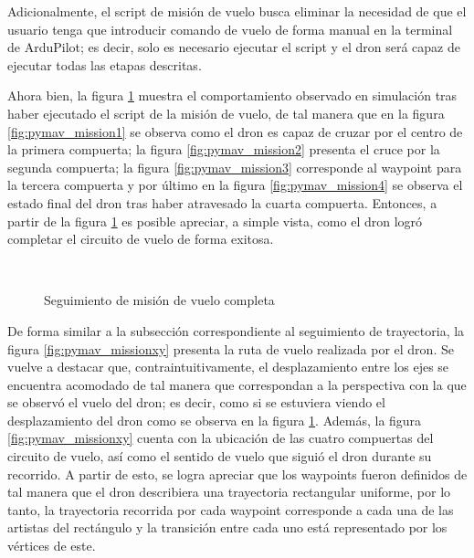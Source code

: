 Adicionalmente, el script de misión de vuelo busca eliminar la necesidad de que el usuario tenga que introducir comando de vuelo de forma manual en la terminal de ArduPilot; es decir, solo es necesario ejecutar el script y el dron será capaz de ejecutar todas las etapas descritas.

Ahora bien, la figura \ref{fig:pymav_mission} muestra el comportamiento observado en simulación tras haber ejecutado el script de la misión de vuelo, de tal manera que en la figura \ref{fig:pymav_mission1} se observa como el dron es capaz de cruzar por el centro de la primera compuerta; la figura \ref{fig:pymav_mission2} presenta el cruce por la segunda compuerta; la figura \ref{fig:pymav_mission3} corresponde al waypoint para la tercera compuerta y por último en la figura \ref{fig:pymav_mission4} se observa el estado final del dron tras haber atravesado la cuarta compuerta. Entonces, a partir de la figura \ref{fig:pymav_mission} es posible apreciar, a simple vista, como el dron logró completar el circuito de vuelo de forma exitosa.  

\begin{figure}[ht]
    \centering
    \hfill
    \\
    \hfill
    \hfill

    \caption{Seguimiento de misión de vuelo completa}
    \label{fig:pymav_mission}
\end{figure}

De forma similar a la subsección correspondiente al seguimiento de trayectoria, la figura \ref{fig:pymav_missionxy} presenta la ruta de vuelo realizada por el dron. Se vuelve a destacar que, contraintuitivamente, el desplazamiento entre los ejes se encuentra acomodado de tal manera que correspondan a la perspectiva con la que se observó el vuelo del dron; es decir, como si se estuviera viendo el desplazamiento del dron como se observa en la figura \ref{fig:pymav_mission}. Además, la figura \ref{fig:pymav_missionxy} cuenta con la ubicación de las cuatro compuertas del circuito de vuelo, así como el sentido de vuelo que siguió el dron durante su recorrido. A partir de esto, se logra apreciar que los waypoints fueron definidos de tal manera que el dron describiera una trayectoria rectangular uniforme, por lo tanto, la trayectoria recorrida por cada waypoint corresponde a cada una de las artistas del rectángulo y la transición entre cada uno está representado por los vértices de este. 

